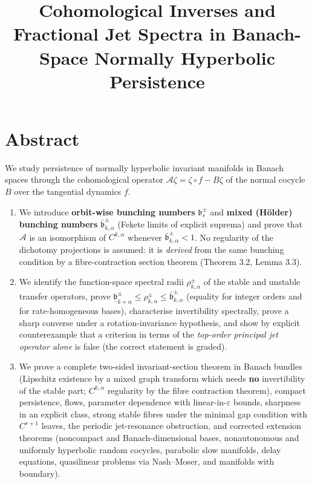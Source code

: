 \documentclass[11pt,a4paper]{article}
\title{Cohomological Inverses and Fractional Jet Spectra in Banach-Space Normally Hyperbolic Persistence}
\author{}
\date{}
\theoremstyle{plain}
\theoremstyle{definition}
\theoremstyle{remark}
\numberwithin{equation}{section}
\numberwithin{figure}{section}
\begin{document}
\maketitle

\section*{Abstract}

We study persistence of normally hyperbolic invariant manifolds in Banach spaces through the cohomological operator $\mathcal A\zeta=\zeta\circ f-B\zeta$ of the normal cocycle $B$ over the tangential dynamics $f$.

\begin{center}
\end{center}

\begin{enumerate}
\item We introduce \textbf{orbit-wise bunching numbers} $\mathfrak b^\pm_s$ and \textbf{mixed (Hölder) bunching numbers} $\bar{\mathfrak b}^\pm_{k,\alpha}$ (Fekete limits of explicit suprema) and prove that $\mathcal A$ is an isomorphism of $C^{k,\alpha}$ whenever $\bar{\mathfrak b}^\pm_{k,\alpha}<1$. No regularity of the dichotomy projections is assumed: it is \textit{derived} from the same bunching condition by a fibre-contraction section theorem (Theorem 3.2, Lemma 3.3).

\item We identify the function-space spectral radii $\rho^\pm_{k,\alpha}$ of the stable and unstable transfer operators, prove $\underline{\mathfrak b}^\pm_{k+\alpha}\le\rho^\pm_{k,\alpha}\le\bar{\mathfrak b}^\pm_{k,\alpha}$ (equality for integer orders and for rate-homogeneous bases), characterise invertibility spectrally, prove a sharp converse under a rotation-invariance hypothesis, and show by explicit counterexample that a criterion in terms of the \textit{top-order principal jet operator alone} is false (the correct statement is graded).

\item We prove a complete two-sided invariant-section theorem in Banach bundles (Lipschitz existence by a mixed graph transform which needs \textbf{no} invertibility of the stable part; $C^{k,\alpha}$ regularity by the fibre contraction theorem), compact persistence, flows, parameter dependence with linear-in-$\varepsilon$ bounds, sharpness in an explicit class, strong stable fibres under the minimal gap condition with $C^{r+1}$ leaves, the periodic jet-resonance obstruction, and corrected extension theorems (noncompact and Banach-dimensional bases, nonautonomous and uniformly hyperbolic random cocycles, parabolic slow manifolds, delay equations, quasilinear problems via Nash–Moser, and manifolds with boundary).
\end{enumerate}
\end{document}
